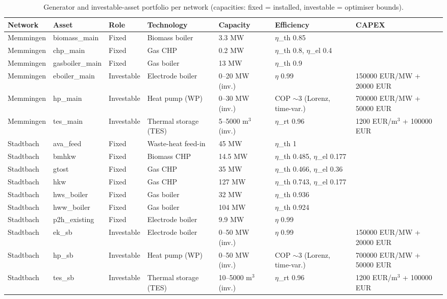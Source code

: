 \begin{table}[htbp]
  \centering
  \caption{Generator and investable-asset portfolio per network (capacities: fixed = installed, investable = optimiser bounds).}
  \label{tab:t1_generators}
  \begin{tabular}{lllllll}
  \toprule
  Network & Asset & Role & Technology & Capacity & Efficiency & CAPEX \\
  \midrule
  Memmingen & biomass\_main & Fixed & Biomass boiler & 3.3 MW & $\eta$\_th 0.85 &  \\
  Memmingen & chp\_main & Fixed & Gas CHP & 0.2 MW & $\eta$\_th 0.8, $\eta$\_el 0.4 &  \\
  Memmingen & gasboiler\_main & Fixed & Gas boiler & 13 MW & $\eta$\_th 0.9 &  \\
  Memmingen & eboiler\_main & Investable & Electrode boiler & 0--20 MW (inv.) & $\eta$ 0.99 & 150000 EUR/MW + 20000 EUR \\
  Memmingen & hp\_main & Investable & Heat pump (WP) & 0--30 MW (inv.) & COP $\sim$3 (Lorenz, time-var.) & 700000 EUR/MW + 50000 EUR \\
  Memmingen & tes\_main & Investable & Thermal storage (TES) & 5--5000 m$^3$ (inv.) & $\eta$\_rt 0.96 & 1200 EUR/m$^3$ + 100000 EUR \\
  \midrule
  Stadtbach & ava\_feed & Fixed & Waste-heat feed-in & 45 MW & $\eta$\_th 1 &  \\
  Stadtbach & bmhkw & Fixed & Biomass CHP & 14.5 MW & $\eta$\_th 0.485, $\eta$\_el 0.177 &  \\
  Stadtbach & gtost & Fixed & Gas CHP & 35 MW & $\eta$\_th 0.466, $\eta$\_el 0.36 &  \\
  Stadtbach & hkw & Fixed & Gas CHP & 127 MW & $\eta$\_th 0.743, $\eta$\_el 0.177 &  \\
  Stadtbach & hws\_boiler & Fixed & Gas boiler & 32 MW & $\eta$\_th 0.936 &  \\
  Stadtbach & hww\_boiler & Fixed & Gas boiler & 104 MW & $\eta$\_th 0.924 &  \\
  Stadtbach & p2h\_existing & Fixed & Electrode boiler & 9.9 MW & $\eta$ 0.99 &  \\
  Stadtbach & ek\_sb & Investable & Electrode boiler & 0--50 MW (inv.) & $\eta$ 0.99 & 150000 EUR/MW + 20000 EUR \\
  Stadtbach & hp\_sb & Investable & Heat pump (WP) & 0--50 MW (inv.) & COP $\sim$3 (Lorenz, time-var.) & 700000 EUR/MW + 50000 EUR \\
  Stadtbach & tes\_sb & Investable & Thermal storage (TES) & 10--5000 m$^3$ (inv.) & $\eta$\_rt 0.96 & 1200 EUR/m$^3$ + 100000 EUR \\
  \bottomrule
  \end{tabular}
\end{table}

